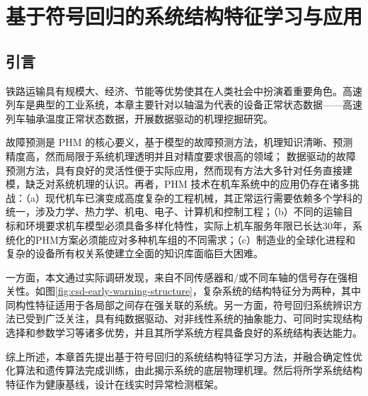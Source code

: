 
\chapter{基于符号回归的系统结构特征学习与应用}
\label{chap:symbolic-regression}

\section{引言}
\label{sec:sr-intro}

铁路运输具有规模大、经济、节能等优势使其在人类社会中扮演着重要角色\cite{2015年交通运输行业发展统计公报}。高速列车是典型的工业系统，本章主要针对以轴温为代表的设备正常状态数据——高速列车轴承温度正常状态数据，开展数据驱动的机理挖掘研究。

故障预测是 PHM 的核心要义，基于模型的故障预测方法，机理知识清晰、预测精度高，然而局限于系统机理透明并且对精度要求很高的领域；
数据驱动的故障预测方法，具有良好的灵活性便于实际应用，然而现有方法大多针对任务直接建模，缺乏对系统机理的认识\cite{lee2014prognostics,彭宇2010故障预测与健康管理技术综述}。再者，PHM 技术在机车系统中的应用仍存在诸多挑战：（a）现代机车已演变成高度复杂的工程机械，其正常运行需要依赖多个学科的统一，涉及力学、热力学、机电、电子、计算机和控制工程；（b）不同的运输目标和环境要求机车模型必须具备多样化特性，实际上机车服务年限已长达30年，系统化的PHM方案必须能应对多种机车组的不同需求；（c）制造业的全球化进程和复杂的设备所有权关系使建立全面的知识库面临巨大困难。

一方面，本文通过实际调研发现，来自不同传感器和/或不同车轴的信号存在强相关性。如图\ref{fig:csd-early-warning-structure}，复杂系统的结构特征分为两种，其中同构性特征适用于各局部之间存在强关联的系统\cite{jiang2006discovering,han2015time}。另一方面，符号回归系统辨识方法已受到广泛关注\cite{schmidt2009distilling,la2016automatic,mcconaghy2011ffx,fortin2012deap}，具有纯数据驱动、对非线性系统的抽象能力、可同时实现结构选择和参数学习等诸多优势，并且其所学系统方程具备良好的系统结构表达能力。

综上所述，本章首先提出基于符号回归的系统结构特征学习方法，并融合确定性优化算法和遗传算法完成训练，由此揭示系统的底层物理机理。然后将所学系统结构特征作为健康基线，设计在线实时异常检测框架。
  
